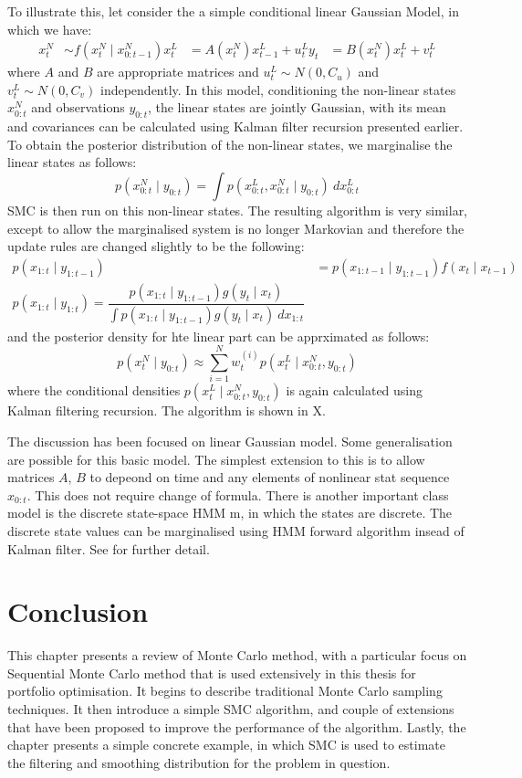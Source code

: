 To illustrate this, let consider the a simple conditional linear Gaussian Model, in which we have:
\begin{align}
  x^N_t  &\sim f(x^N_t \mid x^N _{0:t-1})
  x^L_t  &= A(x^N_t) x^L_{t-1} + u^L_t
  y_t    &= B(x^N_t) x^L_t + v^L_t
\end{align}
where $A$ and $B$ are appropriate matrices and $u^L_t \sim N(0, C_u)$ and $v^L_t\sim N(0, C_v)$ independently. In this model, conditioning the non-linear states $x^N_{0:t}$ and observations $y_{0:t}$, the linear states are jointly Gaussian, with its mean and covariances can be calculated using Kalman filter recursion presented earlier. To obtain the posterior distribution of the non-linear states, we marginalise the linear states as follows:
\begin{equation}
  p(x^N_{0:t} \mid y_{0:t}) = \int p(x^L_{0:t}, x^N_{0:t} \mid y_{0:t})~dx^L_{0:t}
\end{equation}
SMC is then run on this non-linear states. The resulting algorithm is very similar, except to allow the marginalised system is no longer Markovian and therefore the update rules are changed slightly to be the following:
\begin{align}
  p(x_{1:t} \mid y_{1:t-1}) &= p(x_{1:t-1} \mid y_{1:t-1})f(x_t \mid x_{t-1}) \nonumber \\
  p(x_{1:t} \mid y_{1:t}) = \dfrac{p(x_{1:t} \mid y_{1:t-1}) g(y_t \mid x_t)}{\int p(x_{1:t} \mid y_{1:t-1}) g(y_t \mid x_t)~dx_{1:t}}
\end{align}
and the posterior density for hte linear part can be apprximated as follows:
\begin{equation}
  p(x^N_t \mid y_{0:t}) \approx \sum^N_{i=1} w^{(i)}_t p(x^L_t \mid x^N_{0:t}, y_{0:t})
\end{equation}
where the conditional densities $p(x^L_t \mid x^N_{0:t}, y_{0:t})$ is again calculated using Kalman filtering recursion. The algorithm is shown in X.

The discussion has been focused on linear Gaussian model. Some generalisation are possible for this basic model. The simplest extension to this is to allow matrices $A$, $B$ to depeond on time and any elements of nonlinear stat sequence $x_{0:t}$. This does not require change of formula. There is another important class model is the discrete state-space HMM m, in which the states are discrete. The discrete state values can be marginalised using HMM forward algorithm insead of Kalman filter. See \cite{} for further detail.

\section{Conclusion}
This chapter presents a review of Monte Carlo method, with a particular focus on Sequential Monte Carlo method that is used extensively in this thesis for portfolio optimisation. It begins to describe traditional Monte Carlo sampling techniques. It then introduce a simple SMC algorithm, and couple of extensions that have been proposed to improve the performance of the algorithm. Lastly, the chapter presents a simple concrete example, in which SMC is used to estimate the filtering and smoothing distribution for the problem in question.


